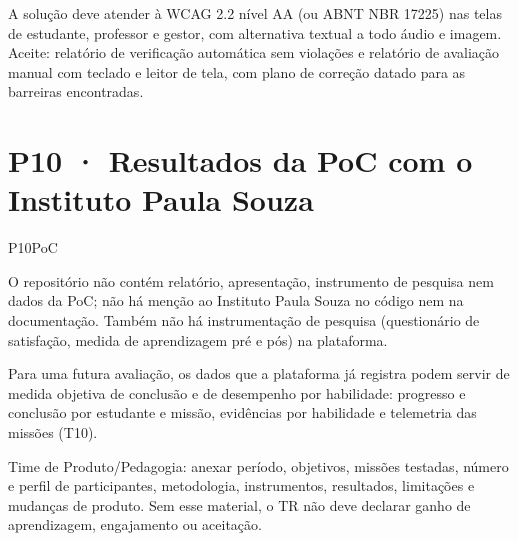 \begin{paraotr}
A solução deve atender à WCAG 2.2 nível AA (ou ABNT NBR 17225) nas telas de
estudante, professor e gestor, com alternativa textual a todo áudio e imagem.
Aceite: relatório de verificação automática sem violações e relatório de
avaliação manual com teclado e leitor de tela, com plano de correção datado
para as barreiras encontradas.
\end{paraotr}

\section{P10 · Resultados da PoC com o Instituto Paula Souza}
\label{sec:p10}

\begin{resposta}{P10}{PoC}{\foradorepo}
\begin{campos}
  \item[Hoje] O repositório não contém relatório, apresentação, instrumento de
    pesquisa nem dados da PoC; não há menção ao Instituto Paula Souza no
    código nem na documentação. Também não há instrumentação de pesquisa
    (questionário de satisfação, medida de aprendizagem pré e pós) na
    plataforma.
  \item[O que a plataforma oferece] Para uma futura avaliação, os dados que a
    plataforma já registra podem servir de medida objetiva de conclusão e de
    desempenho por habilidade: progresso e conclusão por estudante e missão,
    evidências por habilidade e telemetria das missões (T10).
  \item[Lacuna] Time de Produto/Pedagogia: anexar período, objetivos,
    missões testadas, número e perfil de participantes, metodologia,
    instrumentos, resultados, limitações e mudanças de produto. Sem esse
    material, o TR não deve declarar ganho de aprendizagem, engajamento ou
    aceitação.
\end{campos}
\end{resposta}
